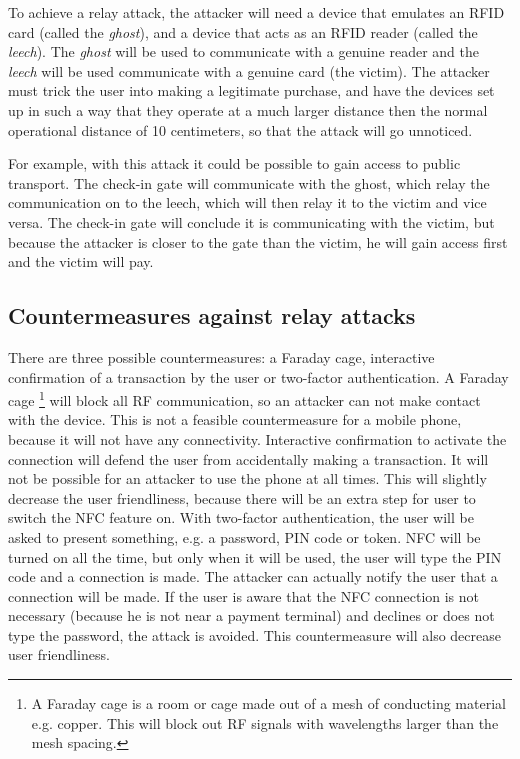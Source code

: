 To achieve a relay attack, the attacker will need a device that emulates an RFID card (called the \textit{ghost}), and a device that acts as an RFID reader (called the \textit{leech}).
The \textit{ghost} will be used to communicate with a genuine reader and the \textit{leech} will be used communicate with a genuine card (the victim).
The attacker must trick the user into making a legitimate purchase, and have the devices set up in such a way that they operate at a much larger distance then the normal operational distance of 10 centimeters, so that the attack will go unnoticed. \cite{1128470}

For example, with this attack it could be possible to gain access to public transport.
The check-in gate will communicate with the ghost, which relay the communication on to the leech, which will then relay it to the victim and vice versa.
The check-in gate will conclude it is communicating with the victim, but because the attacker is closer to the gate than the victim, he will gain access first and the victim will pay.

\subsection{Countermeasures against relay attacks}
There are three possible countermeasures: a Faraday cage, interactive confirmation of a transaction by the user or two-factor authentication.
A Faraday cage \footnote{A Faraday cage is a room or cage made out of a mesh of conducting material e.g. copper. This will block out RF signals with wavelengths larger than the mesh spacing.}  will block all RF communication, so an attacker can not make contact with the device.
This is not a feasible countermeasure for a mobile phone, because it will not have any connectivity.
Interactive confirmation to activate the connection will defend the user from accidentally making a transaction.
It will not be possible for an attacker to use the phone at all times.
This will slightly decrease the user friendliness, because there will be an extra step for user to switch the NFC feature on.
With two-factor authentication, the user will be asked to present something, e.g. a password, PIN code or token.
NFC will be turned on all the time, but only when it will be used, the user will type the PIN code and a connection is made.
The attacker can actually notify the user that a connection will be made.
If the user is aware that the NFC connection is not necessary (because he is not near a payment terminal) and declines or does not type the password, the attack is avoided.
This countermeasure will also decrease user friendliness. \cite{1128470}

